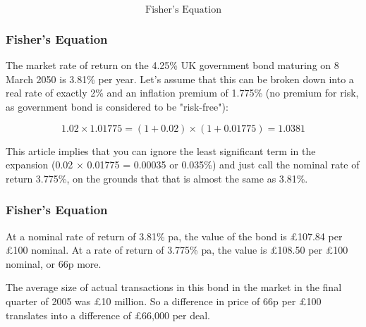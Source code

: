 \documentclass{beamer}
\begin{document}
\begin{frame}
\Large
\[
\mbox{Fisher's Equation}
\]
\end{frame}

\begin{frame}
\frametitle{Fisher's Equation}
The market rate of return on the 4.25\% UK government bond maturing on 8 March 2050 is 3.81\% per year. Let's assume that this can be broken down into a real rate of exactly 2\% and an inflation premium of 1.775\% (no premium for risk, as government bond is considered to be "risk-free"):

\[ 1.02 × 1.01775 = (1 + 0.02) × (1 + 0.01775) = 1.0381 \]

This article implies that you can ignore the least significant term in the expansion (0.02 × 0.01775 = 0.00035 or 0.035\%) and just call the nominal rate of return 3.775\%, on the grounds that that is almost the same as 3.81\%.
\end{frame}

\begin{frame}
\frametitle{Fisher's Equation}

At a nominal rate of return of 3.81\% pa, the value of the bond is £107.84 per £100 nominal. At a rate of return of 3.775\% pa, the value is £108.50 per £100 nominal, or 66p more.

The average size of actual transactions in this bond in the market in the final quarter of 2005 was £10 million. So a difference in price of 66p per £100 translates into a difference of £66,000 per deal.
\end{frame}
\end{document}
